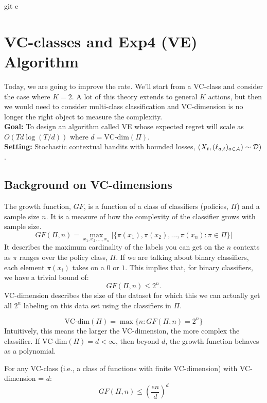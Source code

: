 git c\documentclass[11pt]{article}
\begin{document}
\section{VC-classes and Exp4 (VE) Algorithm \cite{beygelzimer2011contextual}}
Today, we are going to improve the rate. We'll start from a VC-class and consider the case where $K=2$. A lot of this theory extends to general $K$ actions, but then we would need to consider multi-class classification and VC-dimension is no longer the right object to measure the complexity. \hfill
\newline \\
\textbf{Goal:} To design an algorithm called VE whose expected regret will scale as $O(Td\log(T/d))$ where $d = \text{VC-dim}(\Pi)$. \hfill
\newline\\
\textbf{Setting:} Stochastic contextual bandits with bounded losses, $(X_t,(\ell_{a,t})_{a\in\mathcal{A}})\sim\mathcal{D})$. 



\subsection{Background on VC-dimensions}
The growth function, $GF$, is a function of a class of classifiers (policies, $\Pi$) and a sample size $n$. It is a measure of how the complexity of the classifier grows with sample size.
\begin{equation}
GF(\Pi,n) = \max_{x_1,x_2,\ldots, x_n} | \{\pi(x_1),\pi(x_2),\ldots,\pi(x_n): \pi \in \Pi\}|
\end{equation}
It describes the maximum cardinality of the labels you can get on the $n$ contexts as $\pi$ ranges over the policy class, $\Pi$. If we are talking about binary classifiers, each element $\pi(x_i)$ takes on a $0$ or $1$. This implies that, for binary classifiers, we have a trivial bound of: 
$$
GF(\Pi,n) \le 2^n.
$$
VC-dimension describes the size of the dataset for which this we can actually get all $2^n$ labeling on this data set using the classifiers in $\Pi$.

\begin{equation}
\text{VC-dim}(\Pi) = \max \{n: GF(\Pi,n) = 2^n\}
\end{equation}
Intuitively, this means the larger the VC-dimension, the more complex the classifier. If VC-dim$(\Pi) = d < \infty$, then beyond $d$, the growth function behaves as a polynomial. 

For any VC-class (i.e., a class of functions with finite VC-dimension) with VC-dimension = $d$:
\begin{equation}\label{eq: growth function bound}
GF(\Pi, n) \le \left(\frac{en}{d}\right)^d
\end{equation}
\end{document}
